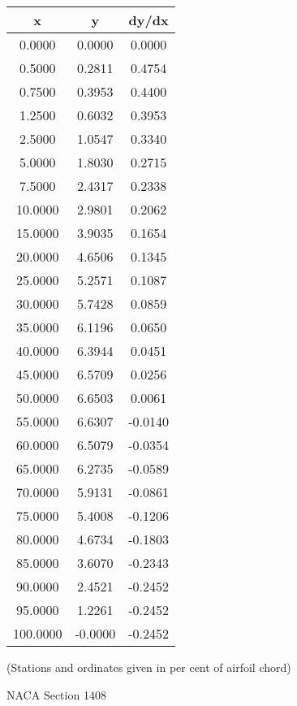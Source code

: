 \documentclass[11pt]{book}
\begin{document}
 \vspace{8mm}
 \begin{tabular}{|c|c|c|}  \hline
 x & y & dy/dx \\
 \hline
0.0000 & 0.0000 & 0.0000 \\
0.5000 & 0.2811 & 0.4754 \\
0.7500 & 0.3953 & 0.4400 \\
1.2500 & 0.6032 & 0.3953 \\
2.5000 & 1.0547 & 0.3340 \\
5.0000 & 1.8030 & 0.2715 \\
7.5000 & 2.4317 & 0.2338 \\
10.0000 & 2.9801 & 0.2062 \\
15.0000 & 3.9035 & 0.1654 \\
20.0000 & 4.6506 & 0.1345 \\
25.0000 & 5.2571 & 0.1087 \\
30.0000 & 5.7428 & 0.0859 \\
35.0000 & 6.1196 & 0.0650 \\
40.0000 & 6.3944 & 0.0451 \\
45.0000 & 6.5709 & 0.0256 \\
50.0000 & 6.6503 & 0.0061 \\
55.0000 & 6.6307 & -0.0140 \\
60.0000 & 6.5079 & -0.0354 \\
65.0000 & 6.2735 & -0.0589 \\
70.0000 & 5.9131 & -0.0861 \\
75.0000 & 5.4008 & -0.1206 \\
80.0000 & 4.6734 & -0.1803 \\
85.0000 & 3.6070 & -0.2343 \\
90.0000 & 2.4521 & -0.2452 \\
95.0000 & 1.2261 & -0.2452 \\
100.0000 & -0.0000 & -0.2452 \\
 \hline
 \end{tabular}
 \vspace{8mm}

(Stations and ordinates given in per cent of airfoil chord)

 \newpage
  \label{s1408}
 \begin{Large}
 NACA Section 1408
 \end{Large}
  
\end{document}
